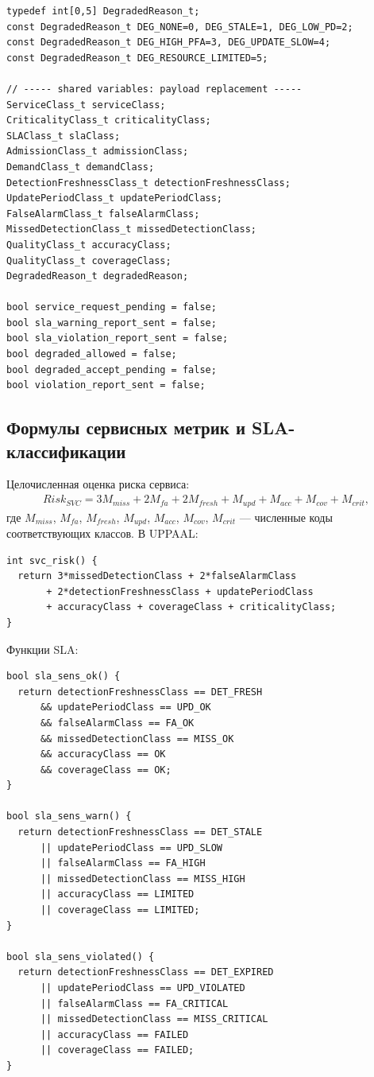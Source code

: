 \documentclass[10pt,a4paper]{article}
\begin{document}
\begin{verbatim}
typedef int[0,5] DegradedReason_t;
const DegradedReason_t DEG_NONE=0, DEG_STALE=1, DEG_LOW_PD=2;
const DegradedReason_t DEG_HIGH_PFA=3, DEG_UPDATE_SLOW=4;
const DegradedReason_t DEG_RESOURCE_LIMITED=5;

// ----- shared variables: payload replacement -----
ServiceClass_t serviceClass;
CriticalityClass_t criticalityClass;
SLAClass_t slaClass;
AdmissionClass_t admissionClass;
DemandClass_t demandClass;
DetectionFreshnessClass_t detectionFreshnessClass;
UpdatePeriodClass_t updatePeriodClass;
FalseAlarmClass_t falseAlarmClass;
MissedDetectionClass_t missedDetectionClass;
QualityClass_t accuracyClass;
QualityClass_t coverageClass;
DegradedReason_t degradedReason;

bool service_request_pending = false;
bool sla_warning_report_sent = false;
bool sla_violation_report_sent = false;
bool degraded_allowed = false;
bool degraded_accept_pending = false;
bool violation_report_sent = false;
\end{verbatim}

\subsection{Формулы сервисных метрик и SLA-классификации}

Целочисленная оценка риска сервиса:
\[
\begin{array}{l}
Risk_{SVC}=3M_{miss}+2M_{fa}+2M_{fresh}+M_{upd}
+M_{acc}+M_{cov}+M_{crit},
\end{array}
\]
где \(M_{miss}\), \(M_{fa}\), \(M_{fresh}\), \(M_{upd}\), \(M_{acc}\), \(M_{cov}\), \(M_{crit}\) --- численные коды соответствующих классов. В UPPAAL:
\begin{verbatim}
int svc_risk() {
  return 3*missedDetectionClass + 2*falseAlarmClass
       + 2*detectionFreshnessClass + updatePeriodClass
       + accuracyClass + coverageClass + criticalityClass;
}
\end{verbatim}

Функции SLA:
\begin{verbatim}
bool sla_sens_ok() {
  return detectionFreshnessClass == DET_FRESH
      && updatePeriodClass == UPD_OK
      && falseAlarmClass == FA_OK
      && missedDetectionClass == MISS_OK
      && accuracyClass == OK
      && coverageClass == OK;
}

bool sla_sens_warn() {
  return detectionFreshnessClass == DET_STALE
      || updatePeriodClass == UPD_SLOW
      || falseAlarmClass == FA_HIGH
      || missedDetectionClass == MISS_HIGH
      || accuracyClass == LIMITED
      || coverageClass == LIMITED;
}

bool sla_sens_violated() {
  return detectionFreshnessClass == DET_EXPIRED
      || updatePeriodClass == UPD_VIOLATED
      || falseAlarmClass == FA_CRITICAL
      || missedDetectionClass == MISS_CRITICAL
      || accuracyClass == FAILED
      || coverageClass == FAILED;
}
\end{verbatim}
\end{document}
